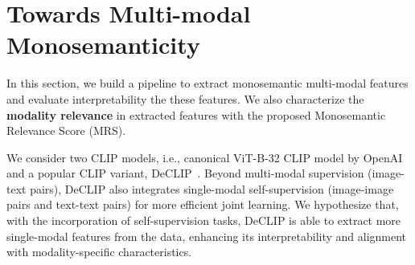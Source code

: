 





\section{Towards Multi-modal Monosemanticity}
In this section, we build a pipeline to extract monosemantic multi-modal features and evaluate interpretability the these features. We also characterize the \textbf{modality relevance} in extracted features with the proposed Monosemantic Relevance Score (MRS).

We consider two CLIP models, i.e., canonical ViT-B-32 CLIP model by OpenAI~\citep{radford2021learning} and a popular CLIP variant, DeCLIP~\citep{li2022supervision}. Beyond multi-modal supervision (image-text pairs), DeCLIP also integrates single-modal self-supervision (image-image pairs and text-text pairs) for more efficient joint learning. We hypothesize that, with the incorporation of self-supervision tasks, DeCLIP is able to extract more single-modal features from the data, enhancing its interpretability and alignment with modality-specific characteristics.


